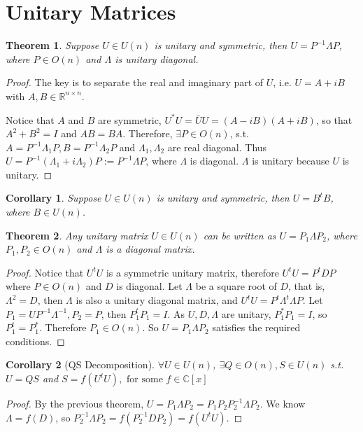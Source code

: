 \documentclass{book}
\newtheorem{theorem}{Theorem}[section]
\newtheorem{corollary}{Corollary}[theorem]
\theoremstyle{definition}
\begin{document}
\section{Unitary Matrices}
\begin{theorem}
    Suppose $U\in U(n)$ is unitary and symmetric, then $U=P^{-1}\Lambda P$, where $P\in O(n)$ and $\Lambda$ is unitary diagonal.
\end{theorem}
\begin{proof}
    The key is to separate the real and imaginary part of $U$, i.e. $U=A+iB$ with $A,B\in \mathbb{R}^{n\times n}$.\par
    Notice that $A$ and $B$ are symmetric, $U^*U=\bar{U}U=(A-iB)(A+iB)$, so that $A^2+B^2=I$ and $AB=BA$.
Therefore, $\exists P\in O(n)$, s.t. $A=P^{-1}\Lambda_1 P,B=P^{-1}\Lambda_2 P$ and $\Lambda_1,\Lambda_2$ are real diagonal.
Thus $U=P^{-1}(\Lambda_1+i\Lambda_2)P:=P^{-1}\Lambda P$, where $\Lambda$ is diagonal. $\Lambda$ is unitary because $U$ is unitary.
\end{proof}
\begin{corollary}
    Suppose $U\in U(n)$ is unitary and symmetric, then $U=B^tB$, where $B\in U(n)$.
\end{corollary}
\begin{theorem}
    Any unitary matrix $U\in U(n)$ can be written as $U=P_{1}\Lambda P_{2}$, where $P_1,P_2\in O(n)$ and $\Lambda$ is a diagonal matrix.
\end{theorem}
\begin{proof}
    Notice that $U^tU$ is a symmetric unitary matrix, therefore $U^tU=P^tDP$ where $P\in O(n)$ and $D$ is diagonal.
Let $\Lambda$ be a square root of $D$, that is, $\Lambda^2=D$, then $\Lambda$ is also a unitary diagonal matrix, and $U^tU=P^t\Lambda^t\Lambda P$.
Let $P_1=UP^{-1}\Lambda^{-1},P_{2}=P$, then $P_1^tP_1=I$. As $U,D,\Lambda$ are unitary, $P_1^*P_1=I$, so $P_1^t=P_1^*$. Therefore $P_1\in O(n)$. So $U=P_1\Lambda P_2$ satisfies the required conditions.
\end{proof}
\begin{corollary}[QS Decomposition]
    $\forall U\in U(n)$, $\exists Q\in O(n),S\in U(n)$ s.t. $U=QS$ and $S=f(U^tU),\text{ for some } f\in \mathbb{C}[x]$
\end{corollary}
\begin{proof}
    By the previous theorem, $U=P_1\Lambda P_2=P_1P_2 P_2^{-1}\Lambda P_2$. 
We know $\Lambda =f(D)$, so $P_2^{-1}\Lambda P_2=f(P_2^{-1}DP_2)=f(U^tU)$.
\end{proof}
\end{document}
